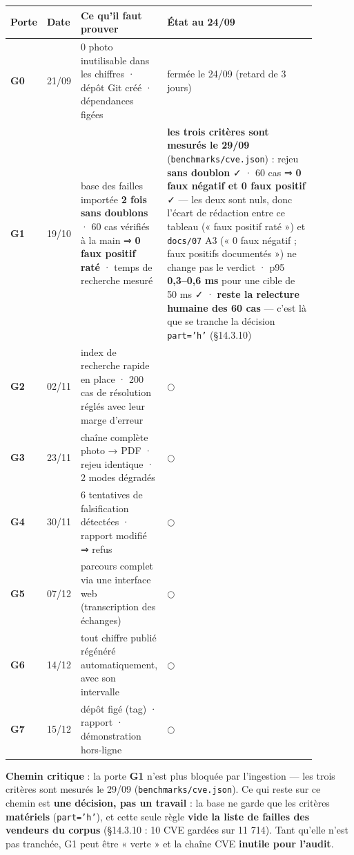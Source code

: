 \documentclass[11pt,a4paper]{article}
\newcommand{\fait}{\textcolor{green!45!black}{\ding{51}}}      %
\newcommand{\encours}{\textcolor{blue!65!black}{\ding{46}}}   %
\newcommand{\afaire}{\textcolor{orange!85!black}{$\bigcirc$}}  %
\begin{document}
\sloppy
\begin{longtable}{|p{0.079\linewidth}|p{0.079\linewidth}|p{0.214\linewidth}|p{0.510\linewidth}|}
\hline
\textbf{Porte} & \textbf{Date} & \textbf{Ce qu'il faut prouver} & \textbf{État au 24/09} \\ \hline
\endhead
\textbf{G0} & 21/09 & 0 photo inutilisable dans les chiffres · dépôt Git créé · dépendances figées & \fait fermée le 24/09 (retard de 3 jours) \\ \hline
\textbf{G1} & 19/10 & base des failles importée \textbf{2 fois sans doublons} · 60 cas vérifiés à la main ⇒ \textbf{0 faux positif raté} · temps de recherche mesuré & \encours \textbf{les trois critères sont mesurés le 29/09} (\texttt{benchmarks/cve.json}) : rejeu \textbf{sans doublon} ✓ · 60 cas ⇒ \textbf{0 faux négatif et 0 faux positif} ✓ — les deux sont nuls, donc l'écart de rédaction entre ce tableau (« faux positif raté ») et \texttt{docs/07} A3 (« 0 faux négatif ; faux positifs documentés ») ne change pas le verdict · p95 \textbf{0,3–0,6 ms} pour une cible de 50 ms ✓ · \textbf{reste la relecture humaine des 60 cas} — c'est là que se tranche la décision \texttt{part='h'} (§14.3.10) \\ \hline
\textbf{G2} & 02/11 & index de recherche rapide en place · 200 cas de résolution réglés avec leur marge d'erreur & \afaire \\ \hline
\textbf{G3} & 23/11 & chaîne complète photo → PDF · rejeu identique · 2 modes dégradés & \afaire \\ \hline
\textbf{G4} & 30/11 & 6 tentatives de falsification détectées · rapport modifié ⇒ refus & \afaire \\ \hline
\textbf{G5} & 07/12 & parcours complet via une interface web (transcription des échanges) & \afaire \\ \hline
\textbf{G6} & 14/12 & tout chiffre publié régénéré automatiquement, avec son intervalle & \afaire \\ \hline
\textbf{G7} & 15/12 & dépôt figé (tag) · rapport · démonstration hors-ligne & \afaire \\ \hline
\end{longtable}
\textbf{Chemin critique} : la porte \textbf{G1} n'est plus bloquée par l'ingestion — les trois critères sont mesurés le 29/09 (\texttt{benchmarks/cve.json}). Ce qui reste sur ce chemin est \textbf{une décision, pas un travail} : la base ne garde que les critères \textbf{matériels} (\texttt{part='h'}), et cette seule règle \textbf{vide la liste de failles des vendeurs du corpus} (§14.3.10 : 10 CVE gardées sur 11 714). Tant qu'elle n'est pas tranchée, G1 peut être « verte » et la chaîne CVE \textbf{inutile pour l'audit}.
\end{document}
